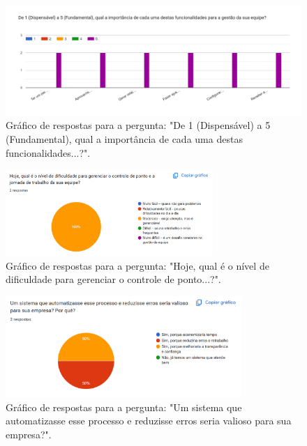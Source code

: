 \begin{apendicesenv}
\begin{figure}[h!]
  \centering
  \includegraphics[width=1\textwidth]{imagens/imagem_importancia_func.png}
  \caption{Gráfico de respostas para a pergunta: "De 1 (Dispensável) a 5 (Fundamental), qual a importância de cada uma destas funcionalidades...?".}
  \label{fig:resp-gestor-importancia-func}
\end{figure}

\begin{figure}[h!]
  \centering
  \includegraphics[width=0.7\textwidth]{imagens/imagem-dificuldade.png}
  \caption{Gráfico de respostas para a pergunta: "Hoje, qual é o nível de dificuldade para gerenciar o controle de ponto...?".}
  \label{fig:resp-gestor-dificuldade}
\end{figure}

\begin{figure}[h!]
  \centering
  \includegraphics[width=0.8\textwidth]{imagens/imagem_valor_automacao.png}
  \caption{Gráfico de respostas para a pergunta: "Um sistema que automatizasse esse processo e reduzisse erros seria valioso para sua empresa?".}
  \label{fig:resp-gestor-valor-automacao}
\end{figure}


\end{apendicesenv}
